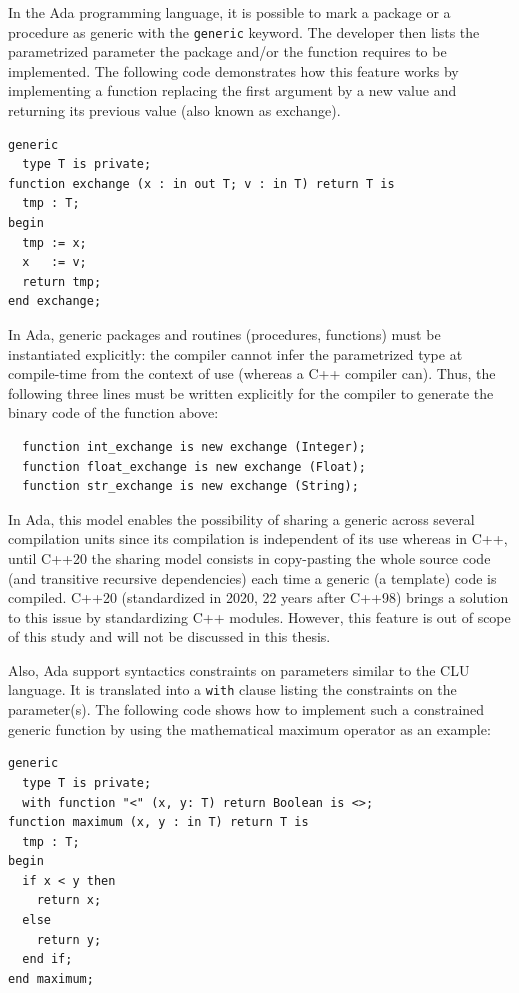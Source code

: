 In the Ada programming language, it is possible to mark a package or a procedure as generic with the \texttt{generic}
keyword. The developer then lists the parametrized parameter the package and/or the function requires to be implemented.
The following code demonstrates how this feature works by implementing a function replacing the first argument by a new
value and returning its previous value (also known as exchange).

\begin{verbatim}
generic
  type T is private;
function exchange (x : in out T; v : in T) return T is
  tmp : T;
begin
  tmp := x;
  x   := v;
  return tmp;
end exchange;
\end{verbatim}

In Ada, generic packages and routines (procedures, functions) must be instantiated explicitly: the compiler cannot infer
the parametrized type at compile-time from the context of use (whereas a C++ compiler can). Thus, the following three
lines must be written explicitly for the compiler to generate the binary code of the function above:
\begin{verbatim}
  function int_exchange is new exchange (Integer);
  function float_exchange is new exchange (Float);
  function str_exchange is new exchange (String);
\end{verbatim}

In Ada, this model enables the possibility of sharing a generic across several compilation units since its compilation is
independent of its use whereas in C++, until C++20 the sharing model consists in copy-pasting the whole source code
(and transitive recursive dependencies) each time a generic (a template) code is compiled. C++20 (standardized in 2020,
22 years after C++98) brings a solution to this issue by standardizing C++ modules. However, this feature is out of scope
of this study and will not be discussed in this thesis.

Also, Ada support syntactics constraints on parameters similar to the CLU language. It is translated into a \texttt{with}
clause listing the constraints on the parameter(s). The following code shows how to implement such a constrained generic
function by using the mathematical maximum operator as an example:

\begin{verbatim}
generic
  type T is private;
  with function "<" (x, y: T) return Boolean is <>;
function maximum (x, y : in T) return T is
  tmp : T;
begin
  if x < y then
    return x;
  else
    return y;
  end if;
end maximum;
\end{verbatim}

